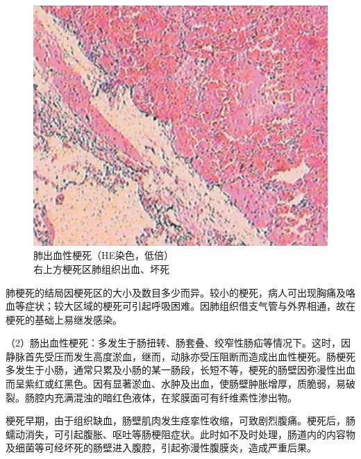 \begin{figure}[!htbp]
  \centering
  \includegraphics{./images/Image00048.jpg}
  \caption{肺出血性梗死（HE染色，低倍） \\ {\small 右上方梗死区肺组织出血、坏死}}
  \label{fig3-14}
\end{figure}


肺梗死的结局因梗死区的大小及数目多少而异。较小的梗死，病人可出现胸痛及咯血等症状；较大区域的梗死可引起呼吸困难。因肺组织借支气管与外界相通，故在梗死的基础上易继发感染。

（2）肠出血性梗死：多发生于肠扭转、肠套叠、绞窄性肠疝等情况下。这时，因静脉首先受压而发生高度淤血，继而，动脉亦受压阻断而造成出血性梗死。肠梗死多发生于小肠，通常只累及小肠的某一肠段，长短不等，梗死的肠壁因弥漫性出血而呈紫红或红黑色。因有显著淤血、水肿及出血，使肠壁肿胀增厚，质脆弱，易破裂。肠腔内充满混浊的暗红色液体，在浆膜面可有纤维素性渗出物。

梗死早期，由于组织缺血，肠壁肌肉发生痉挛性收缩，可致剧烈腹痛。梗死后，肠蠕动消失，可引起腹胀、呕吐等肠梗阻症状。此时如不及时处理，肠道内的内容物及细菌等可经坏死的肠壁进入腹腔，引起弥漫性腹膜炎，造成严重后果。

